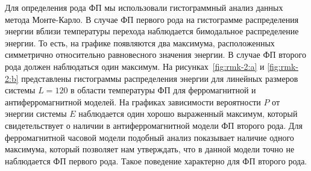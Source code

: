 Для определения рода ФП мы использовали гистограммный анализ данных метода Монте-Карло. В случае ФП первого рода на гистограмме распределения энергии вблизи температуры перехода наблюдается бимодальное распределение энергии. То есть, на графике появляются два максимума, расположенных симметрично относительно равновесного значения энергии. В случае ФП второго рода должен наблюдаться один максимум. На рисунках~\ref{fig:rmk-2:a} и \ref{fig:rmk-2:b} представлены гистограммы распределения энергии для линейных размеров системы $L=120$ в области температуры ФП для ферромагнитной и антиферромагнитной моделей. На графиках зависимости вероятности $P$ от энергии системы $E$ наблюдается один хорошо выраженный максимум, который свидетельствует о наличии в антиферромагнитной модели ФП второго рода. Для ферромагнитной часовой модели подобный анализ показывает наличие одного максимума, который позволяет нам утверждать, что в данной модели точно не наблюдается ФП первого рода. Такое поведение характерно для ФП второго рода.


%
%
%
%
%
%
%

